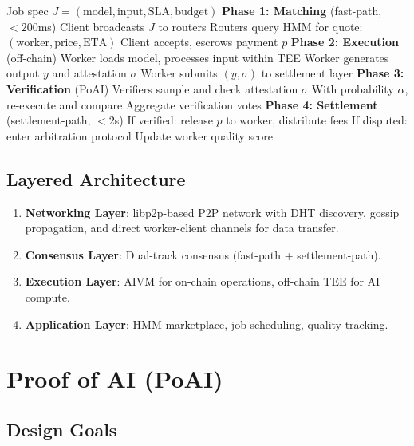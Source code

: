 \documentclass[11pt,twocolumn]{article}
\begin{document}
\begin{algorithm}[H]
\caption{ACI Job Lifecycle}
\label{alg:lifecycle}
\begin{algorithmic}[1]
\Require Job spec $J = (\text{model}, \text{input}, \text{SLA}, \text{budget})$
\State \textbf{Phase 1: Matching} (fast-path, $< 200$ms)
\State Client broadcasts $J$ to routers
\State Routers query HMM for quote: $(\text{worker}, \text{price}, \text{ETA})$
\State Client accepts, escrows payment $p$
\State \textbf{Phase 2: Execution} (off-chain)
\State Worker loads model, processes input within TEE
\State Worker generates output $y$ and attestation $\sigma$
\State Worker submits $(y, \sigma)$ to settlement layer
\State \textbf{Phase 3: Verification} (PoAI)
\State Verifiers sample and check attestation $\sigma$
\State With probability $\alpha$, re-execute and compare
\State Aggregate verification votes
\State \textbf{Phase 4: Settlement} (settlement-path, $< 2$s)
\State If verified: release $p$ to worker, distribute fees
\State If disputed: enter arbitration protocol
\State Update worker quality score
\end{algorithmic}
\end{algorithm}

\subsection{Layered Architecture}

\begin{enumerate}[leftmargin=1.4em]
    \item \textbf{Networking Layer}: libp2p-based P2P network with DHT discovery, gossip propagation, and direct worker-client channels for data transfer.
    \item \textbf{Consensus Layer}: Dual-track consensus (fast-path + settlement-path).
    \item \textbf{Execution Layer}: AIVM for on-chain operations, off-chain TEE for AI compute.
    \item \textbf{Application Layer}: HMM marketplace, job scheduling, quality tracking.
\end{enumerate}

\section{Proof of AI (PoAI)}
\label{sec:poai}

\subsection{Design Goals}
\end{document}

